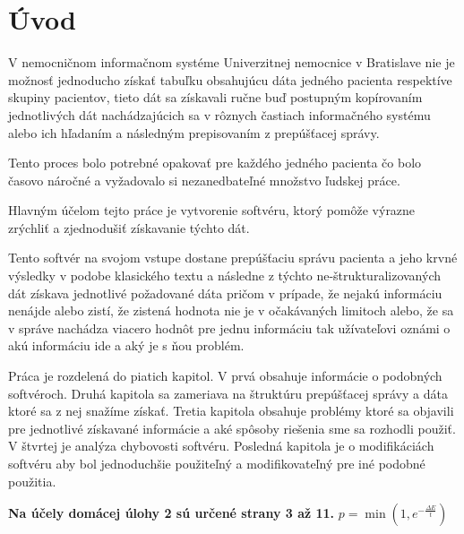 \chapter*{Úvod} %

V nemocničnom informačnom systéme Univerzitnej nemocnice v Bratislave nie je možnosť jednoducho získať tabuľku obsahujúcu dáta jedného pacienta respektíve skupiny pacientov, tieto dát sa získavali ručne buď postupným kopírovaním jednotlivých dát nachádzajúcich sa v rôznych častiach informačného systému alebo ich hľadaním a následným prepisovaním z prepúšťacej správy.

Tento proces bolo potrebné opakovať pre každého jedného pacienta čo bolo časovo náročné a vyžadovalo si nezanedbateľné množstvo ľudskej práce.

Hlavným účelom tejto práce je vytvorenie softvéru, ktorý pomôže výrazne zrýchliť a zjednodušiť získavanie týchto dát.

Tento softvér na svojom vstupe dostane prepúšťaciu správu pacienta a jeho krvné výsledky v podobe klasického textu a následne z týchto ne-štrukturalizovaných dát získava jednotlivé požadované dáta pričom v prípade, že nejakú informáciu nenájde alebo zistí, že zistená hodnota nie je v očakávaných limitoch alebo, že sa v správe nachádza viacero hodnôt pre jednu informáciu tak užívateľovi oznámi o akú informáciu ide a aký je s ňou problém. 

Práca je rozdelená do piatich kapitol. V prvá obsahuje informácie o podobných softvéroch. Druhá kapitola sa zameriava na štruktúru prepúšťacej správy a dáta ktoré sa z nej snažíme získať. Tretia kapitola obsahuje problémy ktoré sa objavili pre jednotlivé získavané informácie a aké spôsoby riešenia sme sa rozhodli použiť. V štvrtej je analýza chybovosti softvéru. Posledná kapitola je o modifikáciách softvéru aby bol jednoduchšie použiteľný a modifikovateľný pre iné podobné použitia.


\textbf{Na účely domácej úlohy 2 sú určené strany 3 až 11.}
$p=\min(1, e^{-\frac{\Delta E}{t}})$



